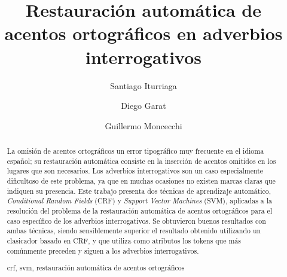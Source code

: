 \documentclass[runningheads,a4paper]{llncs}
\newcommand{\keywords}[1]{\par\addvspace\baselineskip
\noindent\keywordname\enspace\ignorespaces#1}
\begin{document}
\mainmatter  %

\title{Restauración automática de acentos ortográficos en adverbios interrogativos}


\author{Santiago Iturriaga \and Diego Garat \and Guillermo Moncecchi} 

%


\maketitle

\begin{abstract}
La omisión de acentos ortográficos un error tipográfico muy frecuente en el idioma español; su restauración automática consiste en la inserción de acentos omitidos en los lugares que son necesarios. Los adverbios interrogativos son un caso especialmente dificultoso de este problema, ya que en muchas ocasiones no existen marcas claras que indiquen su presencia. Este trabajo presenta dos técnicas de aprendizaje automático, \emph{Conditional Random Fields} (CRF) y \emph{Support Vector Machines} (SVM), aplicadas a la resolución del problema de la restauración automática de acentos ortográficos para el caso específico de los adverbios interrogativos. Se obtuvieron buenos resultados con ambas técnicas, siendo sensiblemente superior el resultado obtenido utilizando un clasicador basado en CRF, y que utiliza como atributos los tokens que más comúnmente preceden y siguen a los adverbios interrogativos.
\keywords{crf, svm, restauración automática de acentos ortográficos}
\end{abstract}
\end{document}
